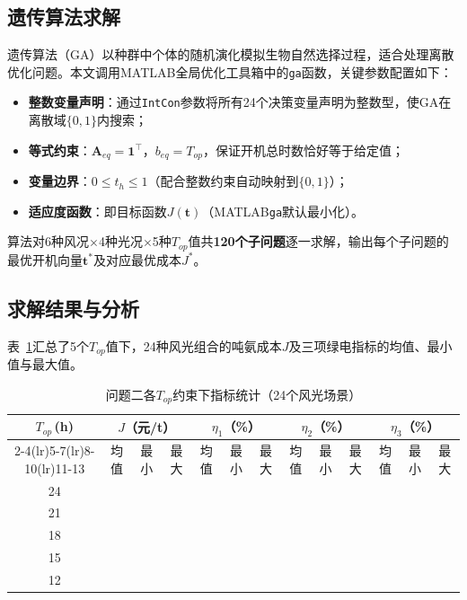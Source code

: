 \documentclass[UTF8,12pt,a4paper]{ctexart}
\newcommand{\blank}[1]{\underline{\makebox[#1][c]{}}}
\newcommand{\RES}{\blank{2cm}}          %
\begin{document}
\subsection{遗传算法求解}

遗传算法（GA）以种群中个体的随机演化模拟生物自然选择过程，适合处理离散优化问题。本文调用MATLAB全局优化工具箱中的\texttt{ga}函数，关键参数配置如下：

\begin{itemize}[leftmargin=3em, itemsep=0.2em]
  \item \textbf{整数变量声明}：通过\texttt{IntCon}参数将所有24个决策变量声明为整数型，使GA在离散域$\{0,1\}$内搜索；
  \item \textbf{等式约束}：$\mathbf{A}_{eq}=\mathbf{1}^{\top}$，$b_{eq}=T_{op}$，保证开机总时数恰好等于给定值；
  \item \textbf{变量边界}：$0\leq t_h\leq1$（配合整数约束自动映射到$\{0,1\}$）；
  \item \textbf{适应度函数}：即目标函数$J(\mathbf{t})$（MATLAB\texttt{ga}默认最小化）。
\end{itemize}

算法对6种风况$\times$4种光况$\times$5种$T_{op}$值共\textbf{120个子问题}逐一求解，输出每个子问题的最优开机向量$\mathbf{t}^*$及对应最优成本$J^*$。

\subsection{求解结果与分析}

表~\ref{tab:p2_summary}汇总了5个$T_{op}$值下，24种风光组合的吨氨成本$J$及三项绿电指标的均值、最小值与最大值。

\begin{table}[htbp]
\centering
\caption{问题二各$T_{op}$约束下指标统计（24个风光场景）}
\label{tab:p2_summary}
\small
\setlength{\tabcolsep}{4pt}
\begin{tabular}{c|ccc|ccc|ccc|ccc}
\toprule
\multirow{2}{*}{$T_{op}$\,(h)}
  & \multicolumn{3}{c|}{$J$（元/t）}
  & \multicolumn{3}{c|}{$\eta_1$（\%）}
  & \multicolumn{3}{c|}{$\eta_2$（\%）}
  & \multicolumn{3}{c}{$\eta_3$（\%）} \\
\cmidrule(lr){2-4}\cmidrule(lr){5-7}\cmidrule(lr){8-10}\cmidrule(lr){11-13}
  & 均值 & 最小 & 最大 & 均值 & 最小 & 最大 & 均值 & 最小 & 最大 & 均值 & 最小 & 最大 \\
\midrule
24 & \RES & \RES & \RES & \RES & \RES & \RES & \RES & \RES & \RES & \RES & \RES & \RES \\
21 & \RES & \RES & \RES & \RES & \RES & \RES & \RES & \RES & \RES & \RES & \RES & \RES \\
18 & \RES & \RES & \RES & \RES & \RES & \RES & \RES & \RES & \RES & \RES & \RES & \RES \\
15 & \RES & \RES & \RES & \RES & \RES & \RES & \RES & \RES & \RES & \RES & \RES & \RES \\
12 & \RES & \RES & \RES & \RES & \RES & \RES & \RES & \RES & \RES & \RES & \RES & \RES \\
\bottomrule
\end{tabular}
\end{table}
\end{document}
